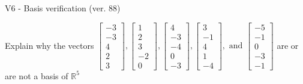 \begin{exercise}
  \begin{exerciseTitle}V6 - Basis verification (ver. 88)\end{exerciseTitle}
  \begin{exerciseStatement}
    Explain why the vectors \(\left[\begin{array}{r}
-3 \\
-3 \\
4 \\
2 \\
3
\end{array}\right] , \left[\begin{array}{r}
1 \\
2 \\
3 \\
-2 \\
0
\end{array}\right] , \left[\begin{array}{r}
4 \\
-3 \\
-4 \\
0 \\
-3
\end{array}\right] , \left[\begin{array}{r}
3 \\
-1 \\
4 \\
1 \\
-4
\end{array}\right] , \text{ and } \left[\begin{array}{r}
-5 \\
-1 \\
0 \\
-3 \\
-1
\end{array}\right]\) are or are not a basis of \(\mathbb{R}^5\)	



\end{exerciseStatement}
\end{exercise}
